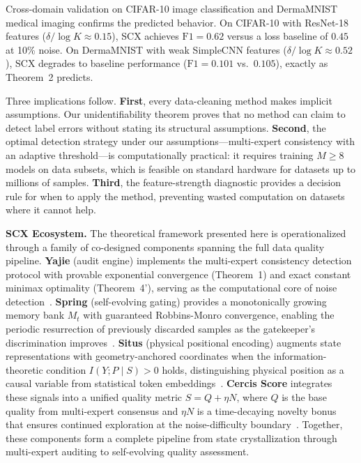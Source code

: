 \documentclass[12pt,a4paper]{article}
\theoremstyle{definition}
\theoremstyle{plain}
\theoremstyle{remark}
\begin{document}
Cross-domain validation on CIFAR-10 image classification and DermaMNIST medical imaging confirms the predicted behavior. On CIFAR-10 with ResNet-18 features ($\delta / \log K \approx 0.15$), SCX achieves $\mathrm{F1}=0.62$ versus a loss baseline of $0.45$ at 10\% noise. On DermaMNIST with weak SimpleCNN features ($\delta / \log K \approx 0.52$), SCX degrades to baseline performance ($\mathrm{F1}=0.101$ vs.\ $0.105$), exactly as Theorem~2 predicts.

Three implications follow. \textbf{First}, every data-cleaning method makes implicit assumptions. Our unidentifiability theorem proves that no method can claim to detect label errors without stating its structural assumptions. \textbf{Second}, the optimal detection strategy under our assumptions---multi-expert consistency with an adaptive threshold---is computationally practical: it requires training $M \geq 8$ models on data subsets, which is feasible on standard hardware for datasets up to millions of samples. \textbf{Third}, the feature-strength diagnostic provides a decision rule for when to apply the method, preventing wasted computation on datasets where it cannot help.

\textbf{SCX Ecosystem.} The theoretical framework presented here is operationalized through a family of co-designed components spanning the full data quality pipeline. \textbf{Yajie} (audit engine) implements the multi-expert consistency detection protocol with provable exponential convergence (Theorem~1) and exact constant minimax optimality (Theorem~4'), serving as the computational core of noise detection~\cite{xi2025scx}. \textbf{Spring} (self-evolving gating) provides a monotonically growing memory bank $M_t$ with guaranteed Robbins-Monro convergence, enabling the periodic resurrection of previously discarded samples as the gatekeeper's discrimination improves~\cite{spring_config}. \textbf{Situs} (physical positional encoding) augments state representations with geometry-anchored coordinates when the information-theoretic condition $I(Y;P \mid S) > 0$ holds, distinguishing physical position as a causal variable from statistical token embeddings~\cite{situs_theory}. \textbf{Cercis Score} integrates these signals into a unified quality metric $S = Q + \eta N$, where $Q$ is the base quality from multi-expert consensus and $\eta N$ is a time-decaying novelty bonus that ensures continued exploration at the noise-difficulty boundary~\cite{taxonomic_nn}. Together, these components form a complete pipeline from state crystallization through multi-expert auditing to self-evolving quality assessment.
\end{document}

